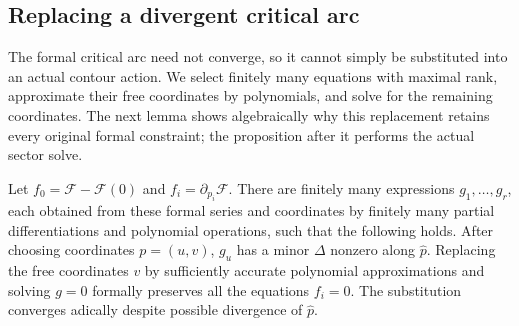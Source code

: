 \subsection{Replacing a divergent critical arc}

The formal critical arc need not converge, so it cannot simply be
substituted into an actual contour action.  We select finitely many
equations with maximal rank, approximate their free coordinates by
polynomials, and solve for the remaining coordinates.  The next lemma
shows algebraically why this replacement retains every original formal
constraint; the proposition after it performs the actual sector solve.

\begin{lemma}\label{arr:formal-replacement}
Let \(f_0=\mathcal F-\mathcal F(0)\) and
\(f_i=\partial_{p_i}\mathcal F\).
There are finitely many expressions \(g_1,\dots,g_r\), each
obtained from these formal series and coordinates by finitely
many partial differentiations and polynomial operations,
such that the following holds.
After choosing coordinates \(p=(u,v)\), \(g_u\) has a minor
\(\Delta\) nonzero along \(\widehat p\).
Replacing the free coordinates \(v\) by sufficiently accurate
polynomial approximations and solving \(g=0\) formally preserves
all the equations \(f_i=0\).  The substitution converges
adically despite possible divergence of \(\widehat p\).
\end{lemma}

